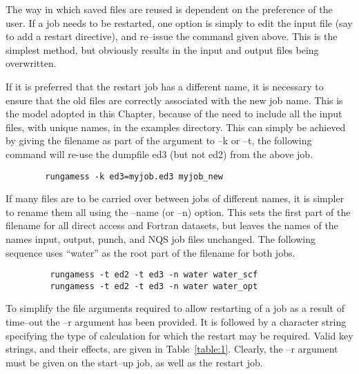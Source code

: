 \documentclass[11pt,fleqn]{article}
\begin{document}
The way in which saved files are reused is dependent on the preference
of the user. If a job needs to be restarted, one option is simply to
edit the input file (say to add a restart directive), and re--issue the
command given above. This is the simplest method, but obviously results in the
input and output files being overwritten. 

If it is preferred that the restart job has a different name, it is necessary
to ensure that the old files are correctly associated with the new job name.
This is the model adopted in this Chapter, because of the need to include 
all the input files, with unique names, in the examples directory.
This can simply be achieved by giving the filename as part of the
argument to --k or --t, the following command will
re-use the dumpfile ed3 (but not ed2) from the above job.

{
\footnotesize
\begin{verbatim}
        rungamess -k ed3=myjob.ed3 myjob_new
\end{verbatim}
}
If many files are to be carried over between jobs of different names,
it is simpler to rename them all using the --name (or --n) option. This
sets the first part of the filename for all direct access and Fortran datasets,
but leaves the names of the names
input, output, punch, and NQS job files unchanged.
The following sequence uses ``water'' as the root part of the filename
for both jobs.

{
\footnotesize
\begin{verbatim}
         rungamess -t ed2 -t ed3 -n water water_scf
         rungamess -t ed2 -t ed3 -n water water_opt
\end{verbatim}
}
To simplify the file arguments required to allow restarting of a job as a result
of time--out the --r argument has been provided. It is followed by 
a character string specifying the type of calculation for which the restart 
may be required. Valid key strings, and their effects, are given in Table~\ref{table:1}.
Clearly, the --r argument must be given on the start--up job, as well as the
restart job.
\end{document}
